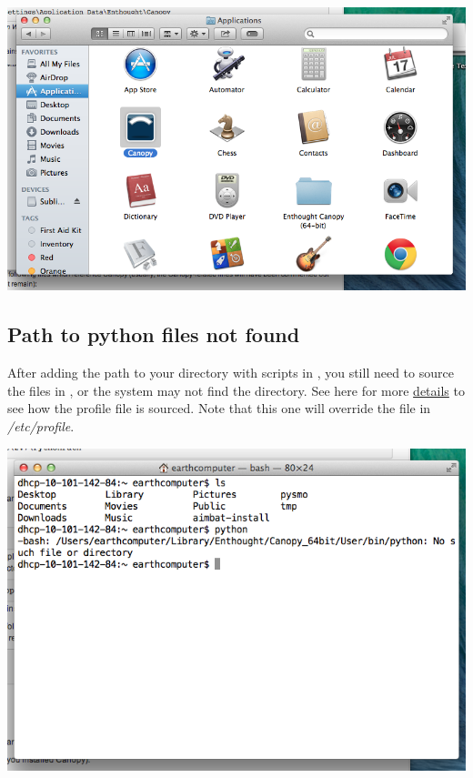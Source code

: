 \documentclass[letterpaper,10pt,english]{sphinxmanual}
\begin{document}
\includegraphics{applications_canopy.png}


\subsection{Path to python files not found}
\label{docfiles/install_dependencies:path-to-python-files-not-found}
After adding the path to your directory with scripts in , you still need to source the  files in , or the system may not find the directory. See here for more \href{http://publib.boulder.ibm.com/infocenter/pseries/v5r3/index.jsp?topic=/com.ibm.aix.baseadmn/doc/baseadmndita/prof\_file.htm}{details} to see how the profile file is sourced. Note that this one will override the file in \emph{/etc/profile}.

\includegraphics{residue.png}
\end{document}

